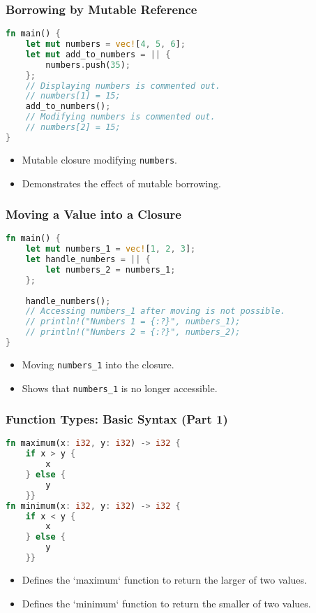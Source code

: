 \documentclass[aspectratio=169, table]{beamer}
\begin{document}
\begin{frame}[fragile]
\frametitle{Borrowing by Mutable Reference}
\vspace{15pt}
\begin{lstlisting}[language=Rust]
fn main() {
	let mut numbers = vec![4, 5, 6];
	let mut add_to_numbers = || {
		numbers.push(35);
	};
	// Displaying numbers is commented out.
	// numbers[1] = 15;
	add_to_numbers();
	// Modifying numbers is commented out.
	// numbers[2] = 15;
}
\end{lstlisting}
\begin{itemize}
\item Mutable closure modifying \texttt{numbers}.
\item Demonstrates the effect of mutable borrowing.
\end{itemize}
\end{frame}

\begin{frame}[fragile]
\frametitle{Moving a Value into a Closure}
\begin{lstlisting}[language=Rust]
fn main() {
	let mut numbers_1 = vec![1, 2, 3];
	let handle_numbers = || {
		let numbers_2 = numbers_1;
	};
	
	handle_numbers();
	// Accessing numbers_1 after moving is not possible.
	// println!("Numbers 1 = {:?}", numbers_1);
	// println!("Numbers 2 = {:?}", numbers_2);
}
\end{lstlisting}
\begin{itemize}
\item Moving \texttt{numbers\_1} into the closure.
\item Shows that \texttt{numbers\_1} is no longer accessible.
\end{itemize}
\end{frame}


\begin{frame}[fragile]
	\frametitle{Function Types: Basic Syntax (Part 1)}
	\vspace{15pt}
	\begin{lstlisting}[language=Rust]
fn maximum(x: i32, y: i32) -> i32 {
	if x > y {
		x
	} else {
		y
	}}
fn minimum(x: i32, y: i32) -> i32 {
	if x < y {
		x
	} else {
		y
	}}
\end{lstlisting}
	\begin{itemize}
		\item Defines the `maximum` function to return the larger of two values.
		\item Defines the `minimum` function to return the smaller of two values.
	\end{itemize}
\end{frame}
\end{document}
